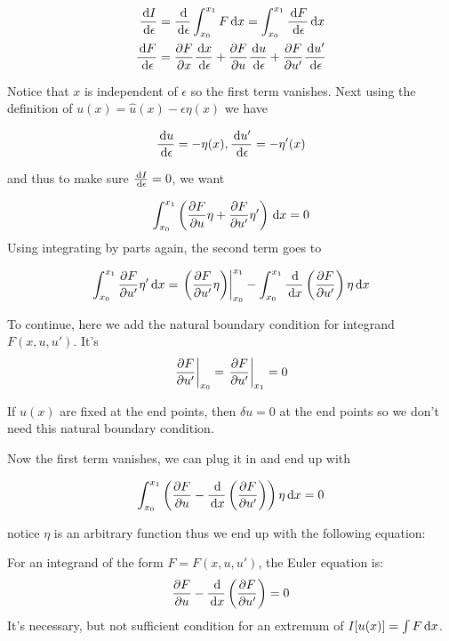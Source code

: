 \documentclass{article}
\begin{document}
\begin{align*}
    \frac{\,\mathrm{d} I}{\,\mathrm{d} \epsilon}&=\frac{\,\mathrm{d}}{\,\mathrm{d}\epsilon}\int_{x_0}^{x_1} F\,\mathrm{d} x=\int_{x_0}^{x_1} \frac{\,\mathrm{d} F}{\,\mathrm{d}\epsilon}\,\mathrm{d} x\\
    \frac{\,\mathrm{d} F}{\,\mathrm{d} \epsilon} &= \frac{\partial F}{\partial x}\frac{\,\mathrm{d} x}{\,\mathrm{d} \epsilon} + \frac{\partial F}{\partial u}\frac{\,\mathrm{d} u}{\,\mathrm{d} \epsilon} + \frac{\partial F}{\partial u'}\frac{\,\mathrm{d} u'}{\,\mathrm{d} \epsilon}
\end{align*}

Notice that \(x\) is independent of \(\epsilon\) so the first term vanishes. Next using the definition of \(u(x) = \hat u(x)-\epsilon \eta(x)\) we have

\[ \frac{\,\mathrm{d} u}{\,\mathrm{d} \epsilon} = -\eta(x), \frac{\,\mathrm{d} u'}{\,\mathrm{d} \epsilon} = -\eta'(x)\]

and thus to make sure \(\frac{\,\mathrm{d} I}{\,\mathrm{d}\epsilon}=0\), we want

\[\int_{x_0}^{x_1} \left( \frac{\partial F}{\partial u}\eta + \frac{\partial F}{\partial u'}\eta' \right)\,\mathrm{d} x=0\]
Using integrating by parts again, the second term goes to

\[\int_{x_0}^{x_1}\frac{\partial F}{\partial u'}\eta'\,\mathrm{d} x = \left.\left( \frac{\partial F}{\partial u'}\eta \right)\right|_{x_0}^{x_1} - \int_{x_0}^{x_1} \frac{\,\mathrm{d}}{\,\mathrm{d} x}\left( \frac{\partial F}{\partial u'} \right)\eta\,\mathrm{d} x\]

\begin{definition}
    To continue, here we add the natural boundary condition for integrand \(F(x,u,u')\). It's
    \[\left.\frac{\partial F}{\partial u'}\right|_{x_0}=\left.\frac{\partial F}{\partial u'}\right|_{x_1}=0\]
\end{definition}

\begin{remark}
    If \(u(x)\) are fixed at the end points, then \(\delta u=0\) at the end points so we don't need this natural boundary condition.
\end{remark}

Now the first term vanishes, we can plug it in and end up with

\[\int_{x_0}^{x_1} \left( \frac{\partial F}{\partial u} -\frac{\,\mathrm{d}}{\,\mathrm{d} x}\left( \frac{\partial F}{\partial u'} \right) \right)\eta\,\mathrm{d} x=0\]

notice \(\eta\) is an arbitrary function thus we end up with the following equation:

\begin{definition}
    For an integrand of the form \(F=F(x,u,u')\), the Euler equation is:
    \[\frac{\partial F}{\partial u} -\frac{\,\mathrm{d}}{\,\mathrm{d} x}\left( \frac{\partial F}{\partial u'} \right)=0\]
    It's necessary, but not sufficient condition for an extremum of \(I[u(x)]=\int F\,\mathrm{d} x\).
\end{definition}
\end{document}
